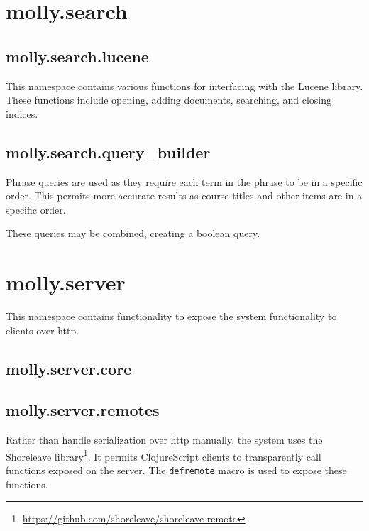 	
	\clearpage
	\section{molly.search}
		\subsection{molly.search.lucene}
			This namespace contains various functions for interfacing with the Lucene library.  These functions include opening, adding documents, searching, and closing indices.
			
		
		\clearpage
		\subsection{molly.search.query\_builder}
			Phrase queries are used as they require each term in the phrase to be in a specific order.  This permits more accurate results as course titles and other items are in a specific order.
			
			These queries may be combined, creating a boolean query.
			
	
	\clearpage
	\section{molly.server}
		This namespace contains functionality to expose the system functionality to clients over \gls{http}.
		
		\subsection{molly.server.core}
		
		\clearpage
		\subsection{molly.server.remotes}
			Rather than handle serialization over \gls{http} manually, the system uses the Shoreleave library\footnote{\url{https://github.com/shoreleave/shoreleave-remote}}.  It permits ClojureScript clients to transparently call functions exposed on the server.  The \texttt{defremote} macro is used to expose these functions.
			
